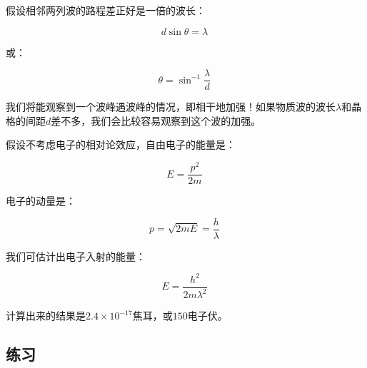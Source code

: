 假设相邻两列波的路程差正好是一倍的波长：

\begin{equation}
d \sin \theta = \lambda~
\end{equation}

或：

\begin{equation}
\theta =  \sin^{-1} \frac{\lambda }{d }~
\end{equation}

我们将能观察到一个波峰遇波峰的情况，即相干地加强！如果物质波的波长$\lambda$和晶格的间距$d$差不多，我们会比较容易观察到这个波的加强。

假设不考虑电子的相对论效应，自由电子的能量是：

\begin{equation}
E = \frac{p^2}{2 m}~
\end{equation}

电子的动量是：

\begin{equation}
p = \sqrt{ 2 m E  } = \frac{h }{\lambda }~
\end{equation}

我们可估计出电子入射的能量：

\begin{equation}
E = \frac{ h^2 }{ 2 m \lambda^2 }~
\end{equation}

计算出来的结果是$2.4 \times 10^{-17} $焦耳，或$150$电子伏。


\subsection*{练习}

